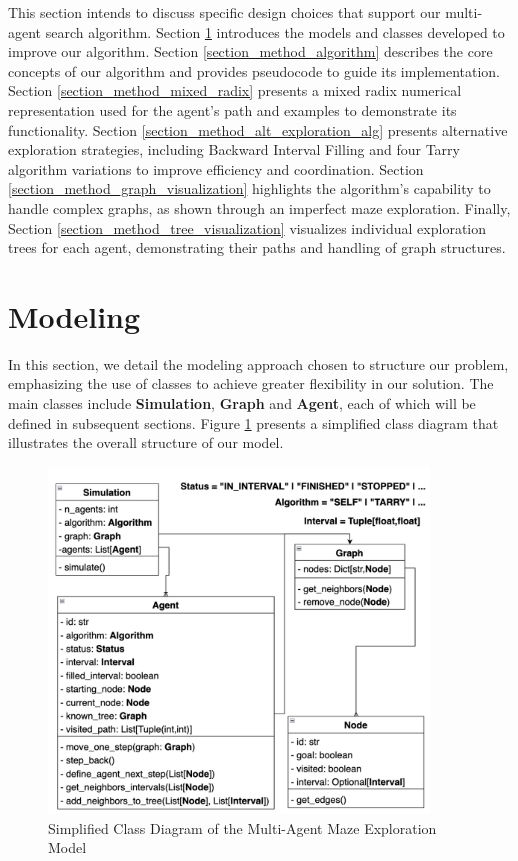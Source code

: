 This section intends to discuss specific design choices that support
our multi-agent search algorithm.
Section \ref{section_method_modeling} introduces the models and classes developed to improve our algorithm.
Section \ref{section_method_algorithm} describes the core concepts of our algorithm and provides pseudocode to guide its implementation.
Section \ref{section_method_mixed_radix} presents a mixed radix numerical representation used for the agent's path and examples to demonstrate its functionality.
Section \ref{section_method_alt_exploration_alg} presents alternative exploration strategies, including Backward Interval Filling and four Tarry algorithm variations to improve efficiency and coordination.
Section \ref{section_method_graph_visualization} highlights the algorithm's capability to handle complex graphs, as shown through an imperfect maze exploration.
Finally, Section \ref{section_method_tree_visualization} visualizes individual exploration trees for each agent, demonstrating their paths and handling of graph structures.

\section{Modeling}
\label{section_method_modeling}

In this section, we detail the modeling approach chosen to structure our problem,
emphasizing the use of classes to achieve greater flexibility in our solution.
The main classes include \textbf{Simulation}, \textbf{Graph} and \textbf{Agent}, each of which will be defined in subsequent sections.
Figure \ref{fig:class_diagram} presents a simplified class diagram that illustrates the overall structure of our model.

\begin{figure}[ht!]
    \centering
    \includegraphics[width=0.9\textwidth]{Cap2/simplified_class_diagram.png}
    \caption{Simplified Class Diagram of the Multi-Agent Maze Exploration Model}
    \label{fig:class_diagram}
\end{figure}

